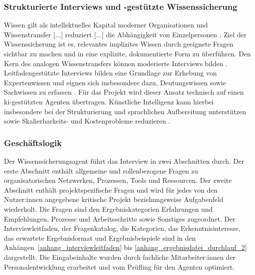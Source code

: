 \documentclass[
  10pt,
  ngerman,
  a4paper,
  toc=graduated,
  numbers=noenddot,
  headings=standardclasses,
  nonumberlist
]{scrartcl}
\begin{document}

\subsubsection{Strukturierte Interviews und -gestützte Wissenssicherung}
\label{strukturierte_interviews_ki_wissenssicherung}

Wissen gilt als \glqq intellektuelles Kapital moderner Organisationen\grqq{} \cite[S. 59]{saugling_praxis_2021} und \glqq Wissenstransfer [...] reduziert [...] die Abhängigkeit von Einzelpersonen\grqq{} \cite[S. 116]{nicole_ottersbock_wissensmanagement_2026}. Ziel der Wissenssicherung ist es, relevantes implizites Wissen durch geeignete Fragen sichtbar zu machen und in eine explizite, dokumentierte Form zu überführen. Den Kern des analogen Wissenstransfers können moderierte Interviews bilden \cite[S. 131]{nicole_ottersbock_wissensmanagement_2026}. Leitfadengestützte Interviews bilden eine Grundlage zur Erhebung von Expertenwissen und eignen sich insbesondere dazu, Deutungswissen sowie Sachwissen zu erfassen \cite[S. 198-200]{saugling_praxis_2021}. Für das Projekt wird dieser Ansatz technisch auf einen \gls{ki}-gestützten Agenten übertragen. Künstliche Intelligenz kann hierbei insbesondere bei der Strukturierung und sprachlichen Aufbereitung unterstützen sowie Skalierbarkeits- und Kostenprobleme reduzieren \cite[S. 131]{nicole_ottersbock_wissensmanagement_2026}.

\subsubsection{Geschäftslogik}
\label{geschäftslogik}
Der Wissenssicherungsagent führt das Interview in zwei Abschnitten durch. Der erste Abschnitt enthält allgemeine und rollenbezogene Fragen zu organisatorischen Netzwerken, Prozessen, Tools und Ressourcen. Der zweite Abschnitt enthält projektspezifische Fragen und wird für jedes von den Nutzer:innen angegebene kritische Projekt beziehungsweise Aufgabenfeld wiederholt. Die Fragen sind den Ergebniskategorien \glqq Erfahrungen und Empfehlungen\grqq{}, \glqq Prozesse und Arbeitsschritte\grqq{} sowie \glqq Sonstiges\grqq{} zugeordnet. Der Interviewleitfaden, der Fragenkatalog, die Kategorien, das Erkenntnisinteresse, das erwartete Ergebnisformat und Ergebnisbeispiele sind in den Anhängen~\ref{anhang_interviewleitfaden} bis \ref{anhang_ergebnisdatei_durchlauf_2} dargestellt. Die Eingabeinhalte wurden durch fachliche Mitarbeiter:innen der Personalentwicklung erarbeitet und vom Prüfling für den Agenten optimiert.
\end{document}
